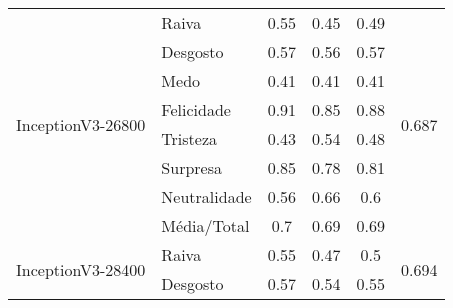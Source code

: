 \begin{table}[]
\begin{tabular}{llcccc}
\multirow{8}{*}{InceptionV3-26800}          & Raiva                 & 0.55                                  & 0.45                                   & 0.49                                  & \multirow{8}{*}{0.687}                \\
                                            & Desgosto              & 0.57                                  & 0.56                                   & 0.57                                  &                                       \\
                                            & Medo                  & 0.41                                  & 0.41                                   & 0.41                                  &                                       \\
                                            & Felicidade            & 0.91                                  & 0.85                                   & 0.88                                  &                                       \\
                                            & Tristeza              & 0.43                                  & 0.54                                   & 0.48                                  &                                       \\
                                            & Surpresa              & 0.85                                  & 0.78                                   & 0.81                                  &                                       \\
                                            & Neutralidade          & 0.56                                  & 0.66                                   & 0.6                                   &                                       \\
                                            & Média/Total           & 0.7                                   & 0.69                                   & 0.69                                  &                                       \\ \hline
\multirow{8}{*}{InceptionV3-28400}          & Raiva                 & 0.55                                  & 0.47                                   & 0.5                                   & \multirow{8}{*}{0.694}                \\
                                            & Desgosto              & 0.57                                  & 0.54                                   & 0.55                                  &                                       \\

\end{tabular}
\end{table}

